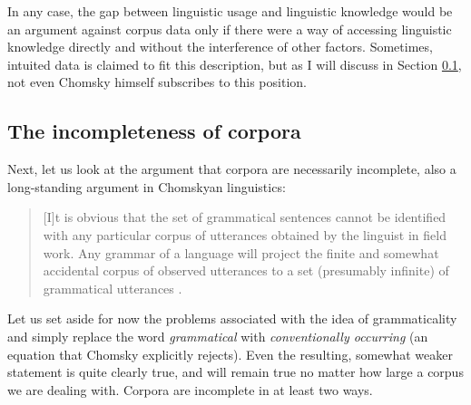 In any case, the gap between linguistic usage and linguistic knowledge would be an argument against corpus data only if there were a way of accessing linguistic knowledge directly and without the interference of other factors. Sometimes, intuited data is claimed to fit this description, but as I will discuss in Section \ref{sec:incompletenessofcorpora}, not even Chomsky himself subscribes to this position.

\subsection{The incompleteness of corpora}
\label{sec:incompletenessofcorpora}

Next, let us look at the argument that corpora are necessarily incomplete, also a long-standing argument in Chomskyan linguistics:

\begin{quote}
[I]t is obvious that the set of grammatical sentences cannot be identified with any particular corpus of utterances obtained by the linguist in field work. Any grammar of a language will project the finite and somewhat accidental corpus of observed utterances to a set (presumably infinite) of grammatical utterances \citep[15]{chomsky_syntactic_1957}.
\end{quote}

Let us set aside for now the problems associated with the idea of grammaticality and simply replace the word \emph{grammatical} with \emph{conventionally occurring} (an equation that Chomsky explicitly rejects). Even the resulting, somewhat weaker statement is quite clearly true, and will remain true no matter how large a corpus we are dealing with. Corpora are incomplete in at least two ways.


